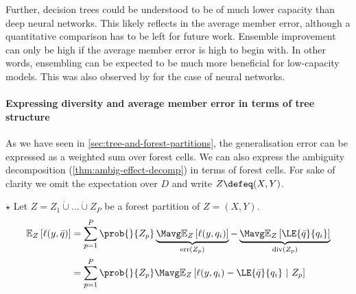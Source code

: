 \documentclass[
	twoside=false, %
]{kaobook}
\begin{document}
Further, decision trees could be understood to be of much lower capacity than deep neural networks. This likely reflects in the average member error, although a quantitative comparison has to be left for future work. Ensemble improvement can only be high if the average member error is high to begin with. In other words, ensembling can be expected to be much more beneficial for low-capacity models. This was also observed by \citeauthor{abe_BestDeepEnsembles_2022} \cite{abe_BestDeepEnsembles_2022} for the case of neural networks.

\paragraph{Expressing diversity and average member error in terms of tree structure} As we have seen in \cref{sec:tree-and-forest-partitions}, the generalisation error can be expressed as a weighted sum over forest cells. 
We can also express the ambiguity decomposition (\cf \ref{thm:ambig-effect-decomp}) in terms of forest cells.
For sake of clarity we omit the expectation over $D$ and write $Z \defeq (X,Y)$.  
\begin{proposition} $\star$
  \label{thm:random-forest-structure-decomp}
Let
$Z = Z_{1} \dot\cup \dots \dot\cup Z_{P}$ be a forest partition of $Z=(X,Y)$.
\begin{align*}
\mathbb{E}_{Z}\left[ \ell(y, \bar{q}) \right]  &= \sum_{p=1}^P \prob{}{Z_{p}}  
\underbrace{
\Mavg \mathbb{E}_{Z}\left[ \ell(y,q_{i})  \right] 
 }_{\text{err}(Z_p) }
 -  
 \underbrace{
\Mavg \mathbb{E}_{Z}\left[ \LE{\bar{q}}{q_{i}} \right]   
}_{\text{div}(Z_p) } 
\\
&= \sum_{p=1}^P \prob{}{Z_{p}} \Mavg \mathbb{E}_{Z}\left[ \ell(y,q_{i}) - \LE{\bar{q}}{q_{i}} ~|~ Z_p \right] 
\end{align*}
\end{proposition}
\end{document}
